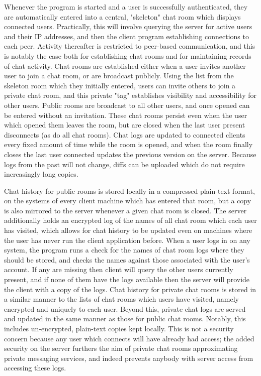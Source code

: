 \documentclass[12pt]{report}
\begin{document}
\begin{flushleft}
\indent Whenever the program is started and a user is successfully authenticated, they are automatically entered into a central, "skeleton" chat room which displays connected users. Practically, this will involve querying the server for active users and their IP addresses, and then the client program establishing connections to each peer. Activity thereafter is restricted to peer-based communication, and this is notably the case both for establishing chat rooms and for maintaining records of chat activity. Chat rooms are established either when a user invites another user to join a chat room, or are broadcast publicly. Using the list from the skeleton room which they initially entered, users can invite others to join a private chat room, and this private "tag" establishes visibility and accessibility for other users. Public rooms are broadcast to all other users, and once opened can be entered without an invitation. These chat rooms persist even when the user which opened them leaves the room, but are closed when the last user present disconnects (as do all chat rooms). Chat logs are updated to connected clients every fixed amount of time while the room is opened, and when the room finally closes the last user connected updates the previous version on the server. Because logs from the past will not change, diffs can be uploaded which do not require increasingly long copies.

\indent Chat history for public rooms is stored locally in a compressed plain-text format, on the systems of every client machine which has entered that room, but a copy is also mirrored to the server whenever a given chat room is closed. The server additionally holds an encrypted log of the names of all chat room which each user has visited, which allows for chat history to be updated even on machines where the user has never run the client application before. When a user logs in on any system, the program runs a check for  the names of chat room logs where they should be stored, and checks the names against those associated with the user's account. If any are missing then client will query the other users currently present, and if none of them have the logs available then the server will provide the client with a copy of the logs. Chat history for private chat rooms is stored in a similar manner to the lists of chat rooms which users have visited, namely encrypted and uniquely to each user. Beyond this, private chat logs are served and updated in the same manner as those for public chat rooms. Notably, this includes un-encrypted, plain-text copies kept locally. This is not a security concern because any user which connects will have already had access; the added security on the server furthers the aim of private chat rooms approximating private messaging services, and indeed prevents anybody with server access from accessing these logs.

\end{flushleft}
\end{document}
